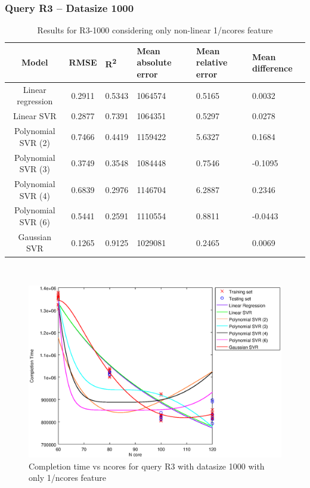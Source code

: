 \documentclass[a4paper,11pt]{article}
\begin{document}
\newpage
\subsubsection{Query R3 -- Datasize 1000}
\begin{table}[H]
	\centering
	\begin{adjustbox}{center}
		\begin{tabular}{c | c M{1.2cm} M{2.5cm} M{2.5cm} M{1.8cm}}
			Model & RMSE & R\textsuperscript{2} & Mean absolute error & Mean relative error & Mean difference \tabularnewline
			\hline
			Linear regression & 0.2911 & 0.5343 & 1064574 & 0.5165 & 0.0032 \\
			Linear SVR & 0.2877 & 0.7391 & 1064351 & 0.5297 & 0.0278 \\
			Polynomial SVR (2) & 0.7466 & 0.4419 & 1159422 & 5.6327 & 0.1684 \\
			Polynomial SVR (3) & 0.3749 & 0.3548 & 1084448 & 0.7546 & -0.1095 \\
			Polynomial SVR (4) & 0.6839 & 0.2976 & 1146704 & 6.2887 & 0.2346 \\
			Polynomial SVR (6) & 0.5441 & 0.2591 & 1110554 & 0.8811 & -0.0443 \\
			Gaussian SVR & 0.1265 & 0.9125 & 1029081 & 0.2465 & 0.0069 \\
		\end{tabular}
	\end{adjustbox}
	\\
	\caption{Results for R3-1000 considering only non-linear 1/ncores feature}
	\label{table_R3_prediction_all}
\end{table}

\begin {figure}[hbtp]
\centering
\includegraphics[width=\textwidth]{output/R3_1000_ONLY_1_OVER_NCORES/plot_R3_1000.eps}
\caption {Completion time vs ncores for query R3 with datasize 1000 with only 1/ncores feature}
\end {figure}
\end{document}
